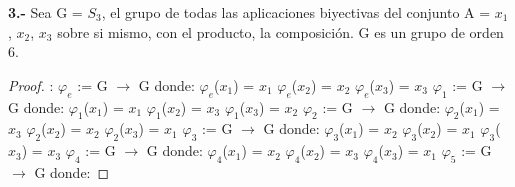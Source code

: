 \documentclass[10pt,a4paper,oneside]{article}
\begin{document}
			\newline
			\newline
			\textbf{3.-} Sea G = $S_{3}$, el grupo de todas las aplicaciones biyectivas del conjunto A = {$x_{1}$, $x_{2}$, $x_{3}$} sobre si mismo, con el producto, la composición. G es un grupo de orden 6.
			\begin{proof}:
				\newline
				\newline
				$\varphi_{e}$ := G $\rightarrow$ G donde:
				\newline
				$\varphi_{e}$($x_{1}$) = $x_{1}$
				\newline
				$\varphi_{e}$($x_{2}$) = $x_{2}$
				\newline
				$\varphi_{e}$($x_{3}$) = $x_{3}$
				\newline
				\newline
				$\varphi_{1}$ := G $\rightarrow$ G donde:
				\newline
				$\varphi_{1}$($x_{1}$) = $x_{1}$
				\newline
				$\varphi_{1}$($x_{2}$) = $x_{3}$
				\newline
				$\varphi_{1}$($x_{3}$) = $x_{2}$
				\newline
				\newline
				$\varphi_{2}$ := G $\rightarrow$ G donde:
				\newline
				$\varphi_{2}$($x_{1}$) = $x_{3}$
				\newline
				$\varphi_{2}$($x_{2}$) = $x_{2}$
				\newline
				$\varphi_{2}$($x_{3}$) = $x_{1}$
				\newline
				\newline
				$\varphi_{3}$ := G $\rightarrow$ G donde:
				\newline
				$\varphi_{3}$($x_{1}$) = $x_{2}$
				\newline
				$\varphi_{3}$($x_{2}$) = $x_{1}$
				\newline
				$\varphi_{3}$($x_{3}$) = $x_{3}$
				\newline
				\newline
				$\varphi_{4}$ := G $\rightarrow$ G donde:
				\newline
				$\varphi_{4}$($x_{1}$) = $x_{2}$
				\newline
				$\varphi_{4}$($x_{2}$) = $x_{3}$
				\newline
				$\varphi_{4}$($x_{3}$) = $x_{1}$
				\newline
				\newline
				$\varphi_{5}$ := G $\rightarrow$ G donde:

\end{proof}
\end{document}
